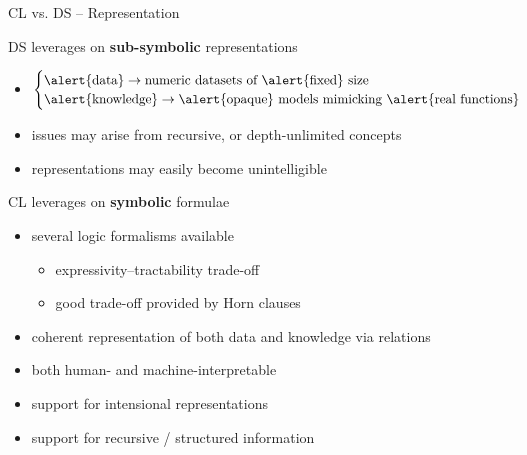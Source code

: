 \documentclass[presentation]{beamer}\mode<presentation>{\usetheme{AMSBolognaFC}}
\begin{document}
\begin{frame}[allowframebreaks]{CL vs. DS -- Representation}
    \begin{block}{DS leverages on \textbf{sub-symbolic} representations}
        \begin{itemize}
            \item $\begin{cases}
                \alert{\text{data}} \rightarrow \text{numeric datasets of \alert{fixed} size}
                \\
                \alert{\text{knowledge}} \rightarrow \text{\alert{opaque} models mimicking \alert{real functions}}
            \end{cases}$
            \item issues may arise from \alert{recursive}, or \alert{depth-unlimited} concepts
            \item representations may easily become \alert{unintelligible} 
        \end{itemize}
    \end{block}

    \begin{block}{CL leverages on \textbf{symbolic} formulae}
        \begin{itemize}
            \item several \alert{logic formalisms} available
            \begin{itemize}
                \item \alert{expressivity--tractability} trade-off
                \item good trade-off provided by \alert{Horn clauses}
            \end{itemize}
            \item coherent representation of \alert{both} data and knowledge via relations
            \item both human- and machine-\alert{interpretable}
            \item support for \alert{intensional} representations
            \item support for \alert{recursive} / structured information
            \end{itemize}
    \end{block}
\end{frame}
\end{document}
